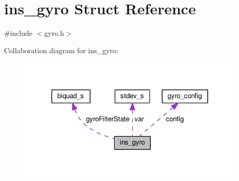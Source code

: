 \hypertarget{structins__gyro}{\section{ins\+\_\+gyro Struct Reference}
\label{structins__gyro}
}


{\ttfamily \#include $<$gyro.\+h$>$}



Collaboration diagram for ins\+\_\+gyro\+:\nopagebreak
\begin{figure}[H]
\begin{center}
\leavevmode
\includegraphics[width=308pt]{structins__gyro__coll__graph}
\end{center}
\end{figure}
